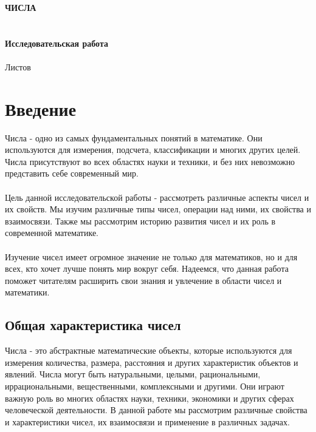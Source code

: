 \documentclass{article}
\begin{document}
\raggedright
\fontsize{14}{16}\selectfont
\thispagestyle{empty}
\clearpage
{}
\bigskip
\begin{center}
\topskip=0pt
\vspace*{\fill}
\textbf{
ЧИСЛА~\\
~\\
~\\
Исследовательская работа\\
}
~\\
Листов \ztotpages\\
\vspace*{\fill}
\end{center}
\begin{center}
\end{center}
\newpage
\tableofcontents
\newpage

\newpage
\section{Введение}
Числа - одно из самых фундаментальных понятий в математике. Они используются для измерения, подсчета, классификации и многих других целей. Числа присутствуют во всех областях науки и техники, и без них невозможно представить себе современный мир.\\
~\\
Цель данной исследовательской работы - рассмотреть различные аспекты чисел и их свойств. Мы изучим различные типы чисел, операции над ними, их свойства и взаимосвязи. Также мы рассмотрим историю развития чисел и их роль в современной математике.\\
~\\
Изучение чисел имеет огромное значение не только для математиков, но и для всех, кто хочет лучше понять мир вокруг себя. Надеемся, что данная работа поможет читателям расширить свои знания и увлечение в области чисел и математики.
\subsection{Общая характеристика чисел}
Числа - это абстрактные математические объекты, которые используются для измерения количества, размера, расстояния и других характеристик объектов и явлений. Числа могут быть натуральными, целыми, рациональными, иррациональными, вещественными, комплексными и другими. Они играют важную роль во многих областях науки, техники, экономики и других сферах человеческой деятельности. В данной работе мы рассмотрим различные свойства и характеристики чисел, их взаимосвязи и применение в различных задачах.
\end{document}
